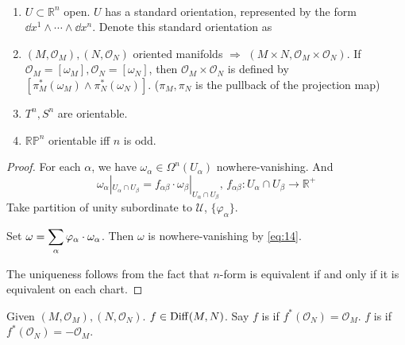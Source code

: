 \begin{example}
    \,
    \begin{enumerate}
        \item $ U\subset \mathbb{R}^n $ open.  $ U $ has a standard orientation, represented by the form  $ \dd x^1\wedge\cdots\wedge \dd x^n $. Denote this standard orientation as 
        \item  $ (M,\mathcal{O}_M),(N,\mathcal{O}_N) $ oriented manifolds $ \Rightarrow $  $ (M\times N,\mathcal{O}_M\times \mathcal{O}_N) $. If  $ \mathcal{O}_M=[\omega_M],\mathcal{O}_N=[\omega_N] $, then  $ \mathcal{O}_M\times \mathcal{O}_N $ is defined by $ [\pi_M^*(\omega_M)\wedge\pi_N^*(\omega_N)] $. ($ \pi_M,\pi_N $ is the pullback of the projection map)
        \item  $ T^n ,S^n$ are orientable.
        \item  $ \mathbb{RP}^n $ orientable iff  $ n $ is odd.
    \end{enumerate}
\end{example}
\begin{proof}
    For each  $ \alpha $, we have  $ \omega_\alpha\in \Omega^n(U_\alpha) $ nowhere-vanishing. And
    \begin{equation}
        \omega_\alpha|_{U_\alpha\cap U_\beta}=f_{\alpha\beta}\cdot\omega_\beta|_{U_\alpha\cap U_\beta},\,f_{\alpha\beta}:U_\alpha\cap U_\beta\rightarrow \mathbb{R}^+\label{eq:14}
    \end{equation}
    Take partition of unity subordinate to  $ \mathcal{U} $,  $ \{\varphi_\alpha\} $.

    Set  $ \omega=\displaystyle\sum_\alpha\varphi_\alpha\cdot\omega_\alpha $. Then  $ \omega $ is nowhere-vanishing by \eqref{eq:14}.

    The uniqueness follows from the fact that  $ n $-form is equivalent if and only if it is equivalent on each chart.
\end{proof}
\begin{definition}
    Given  $ (M,\mathcal{O}_M),(N,\mathcal{O}_N) $.  $ f\in \mathrm{Diff}(M,N) $. Say  $ f $ is  if  $ f^*(\mathcal{O}_N)=\mathcal{O}_M $.  $ f $ is  if  $ f^*(\mathcal{O}_N)=-\mathcal{O}_M $.
\end{definition}